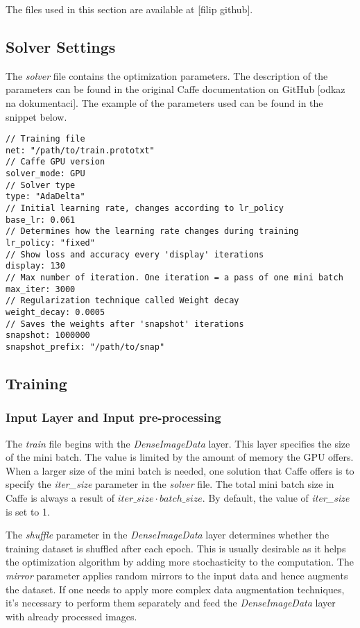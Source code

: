The files used in this section are available at [filip github].

\subsection{Solver Settings}

The \textit{solver} file contains the optimization parameters. The description of the parameters can be found in the original Caffe documentation on GitHub [odkaz na dokumentaci]. The example of the parameters used can be found in the snippet below. 

\begin{lstlisting}
// Training file
net: "/path/to/train.prototxt"	
// Caffe GPU version
solver_mode: GPU
// Solver type		
type: "AdaDelta"
// Initial learning rate, changes according to lr_policy		
base_lr: 0.061		
// Determines how the learning rate changes during training
lr_policy: "fixed"	
// Show loss and accuracy every 'display' iterations
display: 130
// Max number of iteration. One iteration = a pass of one mini batch			
max_iter: 3000	
// Regularization technique called Weight decay		
weight_decay: 0.0005
// Saves the weights after 'snapshot' iterations
snapshot: 1000000		
snapshot_prefix: "/path/to/snap" 
\end{lstlisting}

\subsection{Training}

\subsubsection{Input Layer and Input pre-processing}

The \textit{train} file begins with the \textit{DenseImageData} layer. This layer specifies the size of the mini batch. The value is limited by the amount of memory the GPU offers. When a larger size of the mini batch is needed, one solution that Caffe offers is to specify the \textit{iter\_size} parameter in the \textit{solver} file. The total mini batch size in Caffe is always a result of $iter\_size \cdot batch\_size$. By default, the value of \textit{iter\_size} is set to 1.

The \textit{shuffle} parameter in the \textit{DenseImageData} layer determines whether the training dataset is shuffled after each epoch. This is usually desirable as it helps the optimization algorithm by adding more stochasticity to the computation. The \textit{mirror} parameter applies random mirrors to the input data and hence augments the dataset. If one needs to apply more complex data augmentation techniques, it's necessary to perform them separately and feed the \textit{DenseImageData} layer with already processed images.

